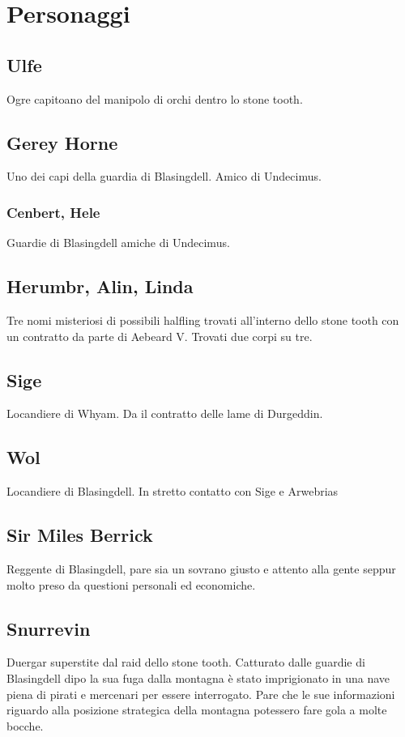\section{Personaggi}
\subsection{Ulfe}\label{char:ulfe}
Ogre capitoano del manipolo di orchi dentro lo stone tooth.
\subsection{Gerey Horne}
Uno dei capi della guardia di Blasingdell. Amico di Undecimus.
\subsubsection{Cenbert, Hele}\label{char:cenbert}
Guardie di Blasingdell amiche di Undecimus.
\subsection{Herumbr, Alin, Linda}\label{char:herumbr}
Tre nomi misteriosi di possibili halfling trovati all'interno
dello stone tooth con un contratto da parte di Aebeard V.
Trovati due corpi su tre.
\subsection{Sige}\label{char:sige}
Locandiere di Whyam. Da il contratto delle lame di Durgeddin.
\subsection{Wol}\label{char:wol}
Locandiere di Blasingdell. In stretto contatto con Sige e Arwebrias
\subsection{Sir Miles Berrick}\label{char:milesberrick}
Reggente di Blasingdell, pare sia un sovrano giusto e attento alla gente
seppur molto preso da questioni personali ed economiche.
\subsection{Snurrevin}\label{char:snurrevin}
Duergar superstite dal raid dello stone tooth. Catturato dalle guardie di
Blasingdell dipo la sua fuga dalla montagna \`e stato imprigionato in una
nave piena di pirati e mercenari per essere interrogato. Pare che le
sue informazioni riguardo alla posizione strategica della montagna
potessero fare gola a molte bocche.

